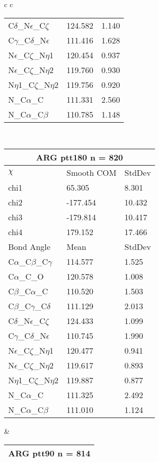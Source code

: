\begin{longtable}{ c c }
\begin{tabular}{ l l l }
  C$\delta$\_N$\epsilon$\_C$\zeta$ & 124.582 & 1.140\\
  C$\gamma$\_C$\delta$\_N$\epsilon$ & 111.416 & 1.628\\
  N$\epsilon$\_C$\zeta$\_N$\eta$1 & 120.454 & 0.937\\
  N$\epsilon$\_C$\zeta$\_N$\eta$2 & 119.760 & 0.930\\
  N$\eta$1\_C$\zeta$\_N$\eta$2 & 119.756 & 0.920\\
  N\_C$\alpha$\_C & 111.331 & 2.560\\
  N\_C$\alpha$\_C$\beta$ & 110.785 & 1.148\\
  \bottomrule
  \end{tabular}
  \\
  \begin{tabular}{ l l l }
  \toprule
  \multicolumn{3}{c}{ARG \textbf{ptt180} n = 820} \\ \toprule
  $\chi$       & Smooth COM & StdDev \\ \midrule
  chi1 & 65.305 & 8.301 \\ 
  chi2 & -177.454 & 10.432 \\ 
  chi3 & -179.814 & 10.417 \\ 
  chi4 & 179.152 & 17.466 \\ \midrule
  Bond Angle   & Mean     & StdDev \\ \midrule
  C$\alpha$\_C$\beta$\_C$\gamma$ & 114.577 & 1.525\\
  C$\alpha$\_C\_O & 120.578 & 1.008\\
  C$\beta$\_C$\alpha$\_C & 110.520 & 1.503\\
  C$\beta$\_C$\gamma$\_C$\delta$ & 111.129 & 2.013\\
  C$\delta$\_N$\epsilon$\_C$\zeta$ & 124.433 & 1.099\\
  C$\gamma$\_C$\delta$\_N$\epsilon$ & 110.745 & 1.990\\
  N$\epsilon$\_C$\zeta$\_N$\eta$1 & 120.477 & 0.941\\
  N$\epsilon$\_C$\zeta$\_N$\eta$2 & 119.617 & 0.893\\
  N$\eta$1\_C$\zeta$\_N$\eta$2 & 119.887 & 0.877\\
  N\_C$\alpha$\_C & 111.325 & 2.492\\
  N\_C$\alpha$\_C$\beta$ & 111.010 & 1.124\\
  \bottomrule
  \end{tabular}
  &
  \begin{tabular}{ l l l }
  \toprule
  \multicolumn{3}{c}{ARG \textbf{ptt90} n = 814} \\ \toprule

\end{tabular}
\end{longtable}
